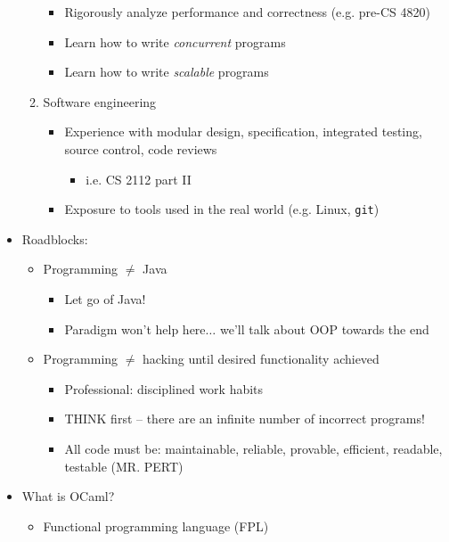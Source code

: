 \begin{itemize}
\begin{enumerate}
\begin{itemize}
            \item Rigorously analyze performance and correctness (e.g. pre-CS 4820)
            \item Learn how to write \textit{concurrent} programs
            \item Learn how to write \textit{scalable} programs
        \end{itemize}
        \item Software engineering
        \begin{itemize}
            \item Experience with modular design, specification, integrated testing, source control, code reviews
            \begin{itemize}
                \item i.e. CS 2112 part II
            \end{itemize}
            \item Exposure to tools used in the real world (e.g. Linux, \texttt{git})
        \end{itemize}
    \end{enumerate}
    \item Roadblocks:
    \begin{itemize}
        \item Programming $\neq$ \textsf{Java}
        \begin{itemize}
            \item Let go of Java!
            \item Paradigm won't help here$\ldots$ we'll talk about OOP towards the end
        \end{itemize}
        \item Programming $\neq$ hacking until desired functionality achieved
        \begin{itemize}
            \item Professional: disciplined work habits
            \item THINK first -- there are an infinite number of incorrect programs!
            \item All code must be: maintainable, reliable, provable, efficient, readable, testable (\textsf{MR. PERT})
        \end{itemize}
    \end{itemize}
    \item What is \textsf{OCaml}?
    \begin{itemize}
        \item Functional programming language (FPL)

\end{itemize}
\end{itemize}

